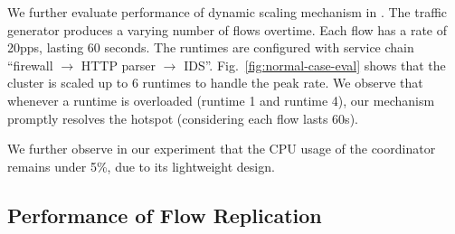 We further evaluate performance of dynamic scaling mechanism in \nfactor. The traffic generator produces a varying number of flows overtime. Each flow has a rate of 20pps, lasting 60 seconds. The runtimes are configured with service chain ``firewall $\rightarrow$ HTTP parser $\rightarrow$ IDS''. Fig.~\ref{fig:normal-case-eval} shows that the cluster is scaled up to 6 runtimes to handle the peak rate. We observe that whenever a runtime is overloaded (runtime 1 and runtime 4), our mechanism promptly resolves the hotspot (considering each flow lasts 60s). %

We further observe in our experiment that the CPU usage of the coordinator remains under 5\%, due to its lightweight design.


\subsection{Performance of Flow Replication}
\label{sec:rp}

